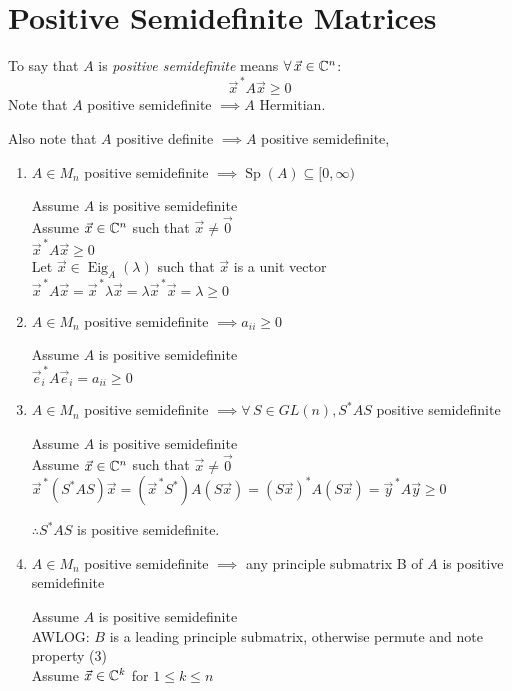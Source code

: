 \documentclass[letterpaper,12pt,fleqn]{article}
\newcommand{\vx}{\vec{x}}
\newcommand{\vxct}{\vx^{\,*}}
\newcommand{\vy}{\vec{y}}
\newcommand{\vyct}{\vy^{\,*}}
\newcommand{\ve}{\vec{e}}
\newcommand{\vect}{\ve^{\,*}}
\newcommand{\vz}{\vec{0}}
\renewcommand{\l}{\lambda}
\DeclareMathOperator{\Sp}{Sp}
\DeclareMathOperator{\Eig}{Eig}
\begin{document}
\section*{Positive Semidefinite Matrices}

\begin{definition}
  To say that $A$ is \emph{positive semidefinite} means
  $\forall\,\vx\in\C^n$:
  \[\vxct A\vx\ge0\]
  Note that $A$ positive semidefinite $\implies A$ Hermitian.
  
  Also note that $A$ positive definite $\implies A$ positive semidefinite,
\end{definition}

\begin{properties}
  \listbreak
  \begin{enumerate}
  \item $A\in M_n$ positive semidefinite $\implies \Sp(A)\subseteq[0,\infty)$

    Assume $A$ is positive semidefinite \\
    Assume $\vx\in\C^n$ such that $\vx\ne\vz$ \\
    $\vxct A\vx\ge0$ \\
    Let $\vx\in\Eig_A(\l)$ such that $\vx$ is a unit vector \\
    $\vxct A\vx=\vxct\l\vx=\l\vxct\vx=\l\ge0$

  \item $A\in M_n$ positive semidefinite $\implies a_{ii}\ge0$

    Assume $A$ is positive semidefinite \\
    $\vect_i A\ve_i=a_{ii}\ge0$

  \item $A\in M_n$ positive semidefinite $\implies \forall\,S\in GL(n),S^*AS$
    positive semidefinite

    Assume $A$ is positive semidefinite \\
    Assume $\vx\in\C^n$ such that $\vx\ne\vz$ \\
    $\vxct(S^*AS)\vx=(\vxct S^*)A(S\vx)=(S\vx)^*A(S\vx)=\vyct A\vy\ge0$

    $\therefore S^*AS$ is positive semidefinite.

  \item $A\in M_n$ positive semidefinite $\implies$ any principle submatrix B of
    $A$ is positive semidefinite

    Assume $A$ is positive semidefinite \\
    AWLOG: $B$ is a leading principle submatrix, otherwise permute and note
    property (3) \\
    Assume $\vx\in\C^k$ for $1\le k\le n$
    

\end{enumerate}
\end{properties}
\end{document}
